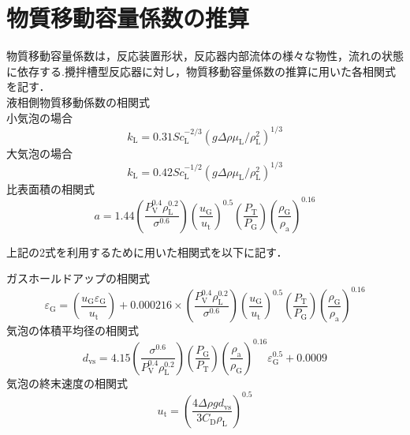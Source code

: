 \documentclass[a4j]{jsreport}
\begin{document}
\section{物質移動容量係数の推算}
物質移動容量係数は，反応装置形状，反応器内部流体の様々な物性，流れの状態に依存する.攪拌槽型反応器に対し，物質移動容量係数の推算に用いた各相関式を記す．
\\
液相側物質移動係数の相関式\cite{化工便覧}\\
小気泡の場合
\begin{equation}
    k_\mathrm{L} = 0.31Sc_\mathrm{L}^{-2/3}(g \varDelta \rho \mu_\mathrm{L}/\rho_\mathrm{L}^2)^{1/3}
\end{equation}
大気泡の場合
\begin{equation}
    k_\mathrm{L} = 0.42Sc_\mathrm{L}^{-1/2}(g \varDelta \rho \mu_\mathrm{L}/\rho_\mathrm{L}^2)^{1/3}
\end{equation}
比表面積の相関式\cite{化工便覧}
\begin{equation}
    a = 1.44 \left( \frac{P_\mathrm{V}^{0.4} \rho_\mathrm{L}^{0.2} }{ \sigma^{0.6}} \right) \left( \frac{u_\mathrm{G}}{u_\mathrm{t}} \right)^{0.5} \left( \frac{P_\mathrm{T}}{P_\mathrm{G}} \right) \left( \frac{\rho_\mathrm{G}}{\rho_\mathrm{a}} \right)^{0.16}
\end{equation}

上記の2式を利用するために用いた相関式を以下に記す．

ガスホールドアップの相関式\cite{化工便覧}
\begin{equation}
    \varepsilon_{{\mathrm G}} = \left( \frac{u_{{\mathrm G}}\varepsilon_{{\mathrm G}}}{u_{{\mathrm t}}} \right) + 0.000216 \times \left( \frac{P_\mathrm{V}^{0.4} \rho_\mathrm{L}^{0.2} }{ \sigma^{0.6}} \right) \left( \frac{u_\mathrm{G}}{u_\mathrm{t}} \right)^{0.5} \left( \frac{P_\mathrm{T}}{P_\mathrm{G}} \right) \left( \frac{\rho_\mathrm{G}}{\rho_\mathrm{a}} \right)^{0.16}
\end{equation}
気泡の体積平均径の相関式\cite{化工便覧}
\begin{equation}
    d_\mathrm{vs} = 4.15 \left( \frac{\sigma^{0.6}}{P_\mathrm{V}^{0.4} \rho_\mathrm{L}^{0.2}} \right) \left( \frac{P_\mathrm{G}}{P_\mathrm{T}} \right) \left( \frac{\rho_\mathrm{a}}{\rho_\mathrm{G}} \right) ^{0.16} \varepsilon_\mathrm{G}^{0.5} + 0.0009
{}\end{equation}
気泡の終末速度の相関式\cite{化工便覧}
\begin{equation}
    u_\mathrm{t} = \left( \frac{4\varDelta \rho g d_\mathrm{vs}}{3C_\mathrm{D} \rho_\mathrm{L}} \right)^{0.5}
\end{equation}
\end{document}
